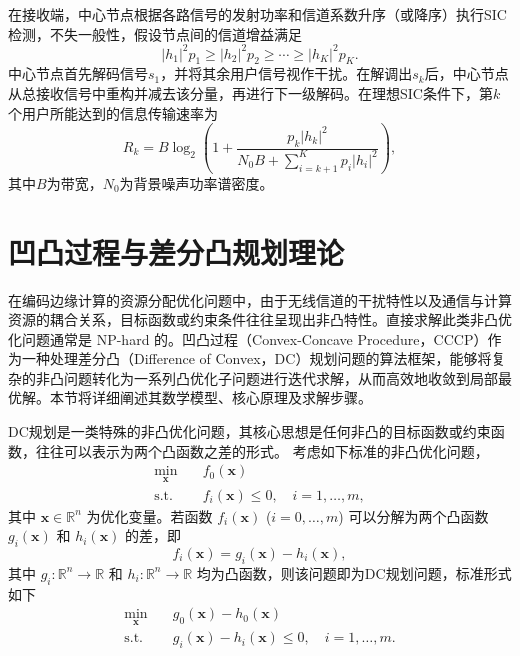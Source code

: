 在接收端，中心节点根据各路信号的发射功率和信道系数升序（或降序）执行SIC检测，不失一般性，假设节点间的信道增益满足
\begin{equation}
	|h_1|^2p_1\geq |h_2|^2p_2\geq \cdots \geq |h_K|^2p_K.
\end{equation}
中心节点首先解码信号$s_1$，并将其余用户信号视作干扰。在解调出$s_k$后，中心节点从总接收信号中重构并减去该分量，再进行下一级解码。在理想SIC条件下，第$k$个用户所能达到的信息传输速率为
\begin{equation}
	R_k = B\log_2\left(1+\frac{p_k|h_k|^2}{N_0B+\sum_{i=k+1}^{K}p_i|h_i|^2}\right),
\end{equation}
其中$B$为带宽，$N_0$为背景噪声功率谱密度。

\section{凹凸过程与差分凸规划理论}

在编码边缘计算的资源分配优化问题中，由于无线信道的干扰特性以及通信与计算资源的耦合关系，目标函数或约束条件往往呈现出非凸特性。直接求解此类非凸优化问题通常是 NP-hard 的。凹凸过程（Convex-Concave Procedure，CCCP）作为一种处理差分凸（Difference of Convex，DC）规划问题的算法框架，能够将复杂的非凸问题转化为一系列凸优化子问题进行迭代求解，从而高效地收敛到局部最优解。本节将详细阐述其数学模型、核心原理及求解步骤。

DC规划是一类特殊的非凸优化问题，其核心思想是任何非凸的目标函数或约束函数，往往可以表示为两个凸函数之差的形式。
考虑如下标准的非凸优化问题，
\begin{equation}
	\begin{aligned}
		\min_{\mathbf{x}} \quad & f_0(\mathbf{x}) \\
		\text{s.t.} \quad & f_i(\mathbf{x}) \leq 0, \quad i = 1, \dots, m,
	\end{aligned}
\end{equation}
其中 $\mathbf{x} \in \mathbb{R}^n$ 为优化变量。若函数 $f_i(\mathbf{x})$ ($i=0,\dots,m$) 可以分解为两个凸函数 $g_i(\mathbf{x})$ 和 $h_i(\mathbf{x})$ 的差，即
\begin{equation}
	f_i(\mathbf{x}) = g_i(\mathbf{x}) - h_i(\mathbf{x}),
\end{equation}
其中 $g_i: \mathbb{R}^n \rightarrow \mathbb{R}$ 和 $h_i: \mathbb{R}^n \rightarrow \mathbb{R}$ 均为凸函数，则该问题即为DC规划问题，标准形式如下
\begin{equation}
	\label{eq:dc_standard}
	\begin{aligned}
		\min_{\mathbf{x}} \quad & g_0(\mathbf{x}) - h_0(\mathbf{x}) \\
		\text{s.t.} \quad & g_i(\mathbf{x}) - h_i(\mathbf{x}) \leq 0, \quad i = 1, \dots, m.
	\end{aligned}
\end{equation}

